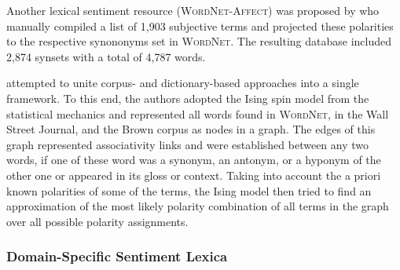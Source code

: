 



Another lexical sentiment resource (\textsc{WordNet-Affect}) was
proposed by \citet{Strapparava:04} who manually compiled a list of
1,903 subjective terms and projected these polarities to the
respective synononyms set in \textsc{WordNet}.  The resulting database
included 2,874 synsets with a total of 4,787 words.

\citet{Takamura:05} attempted to unite corpus- and dictionary-based
approaches into a single framework.  To this end, the authors adopted
the Ising spin model from the statistical mechanics and represented
all words found in \textsc{WordNet}, in the Wall Street Journal, and
the Brown corpus as nodes in a graph.  The edges of this graph
represented associativity links and were established between any two
words, if one of these word was a synonym, an antonym, or a hyponym of
the other one or appeared in its gloss or context.  Taking into
account the a priori known polarities of some of the terms, the Ising
model then tried to find an approximation of the most likely polarity
combination of all terms in the graph over all possible polarity
assignments.

\subsubsection{Domain-Specific Sentiment Lexica}

